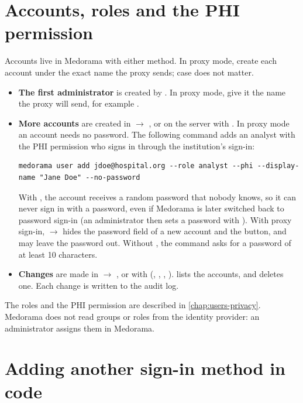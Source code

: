 \section{Accounts, roles and the PHI permission}
\label{sec:sign-in-accounts}

Accounts live in Medorama with either method. In proxy mode, create each account under the exact
name the proxy sends; case does not matter.
\begin{itemize}
\item \textbf{The first administrator} is created by . In proxy mode, give it
  the name the proxy will send, for example
  .
\item \textbf{More accounts} are created in  $\rightarrow$ , or on the server
  with . In proxy mode an account needs no password. The following
  command adds an analyst with the PHI permission who signs in through the institution's
  sign-in:
\begin{lstlisting}[style=shell]
medorama user add jdoe@hospital.org --role analyst --phi --display-name "Jane Doe" --no-password
\end{lstlisting}
  With , the account receives a random password that nobody knows, so it can
  never sign in with a password, even if Medorama is later switched back to password
  sign-in (an administrator then sets a password with ). With proxy sign-in,  $\rightarrow$  hides the password
  field of a new account and the  button, and  may leave the
  password out. Without , the command asks for a password of at least 10
  characters.
\item \textbf{Changes} are made in  $\rightarrow$ , or with
   (, ,
  , ).  lists the
  accounts, and  deletes one. Each change is written to the audit
  log.
\end{itemize}

The roles and the PHI permission are described in \cref{chap:users-privacy}. Medorama does not
read groups or roles from the identity provider: an administrator assigns them in Medorama.

\section{Adding another sign-in method in code}
\label{sec:sign-in-code}

